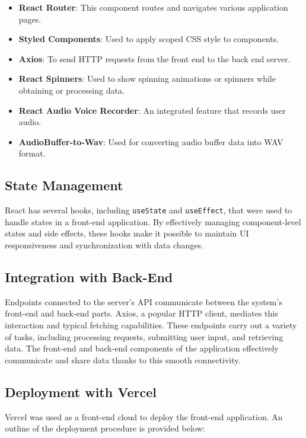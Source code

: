 \documentclass[conference]{IEEEtran}
\begin{document}
\begin{itemize}
\item \textbf{React Router}: This component routes and navigates various application pages.
    \item \textbf{Styled Components}: Used to apply scoped CSS style to components.
     \item \textbf{Axios}: To send HTTP requests from the front end to the back end server.
    \item \textbf{React Spinners}: Used to show spinning animations or spinners while obtaining or processing data.
    \item\textbf{React Audio Voice Recorder}: An integrated feature that records user audio.
    \item \textbf{AudioBuffer-to-Wav}: Used for converting audio buffer data into WAV format.
\end{itemize}

\subsection{State Management}

React has several hooks, including \texttt{useState} and \texttt{useEffect}, that were used to handle states in a front-end application. By effectively managing component-level states and side effects, these hooks make it possible to maintain UI responsiveness and synchronization with data changes.

\subsection{Integration with Back-End}

Endpoints connected to the server's API communicate between the system's front-end and back-end parts. Axios, a popular HTTP client, mediates this interaction and typical fetching capabilities. These endpoints carry out a variety of tasks, including processing requests, submitting user input, and retrieving data. The front-end and back-end components of the application effectively communicate and share data thanks to this smooth connectivity.

\subsection{Deployment with Vercel}

Vercel was used as a front-end cloud to deploy the front-end application. An outline of the deployment procedure is provided below:
\end{document}
